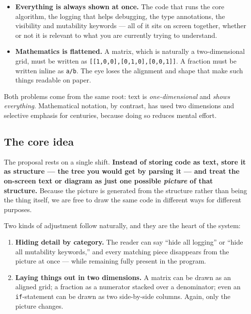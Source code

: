 \documentclass[11pt]{article}
\newcommand{\req}[1]{\textbf{\color{accent}#1}}
\begin{document}
\begin{itemize}[leftmargin=1.4em,itemsep=3pt]
  \item \textbf{Everything is always shown at once.} The code that runs the core algorithm, the logging that helps debugging, the type annotations, the visibility and mutability keywords --- all of it sits on screen together, whether or not it is relevant to what you are currently trying to understand.
  \item \textbf{Mathematics is flattened.} A matrix, which is naturally a two-dimensional grid, must be written as \texttt{[[1,0,0],[0,1,0],[0,0,1]]}. A fraction must be written inline as \texttt{a/b}. The eye loses the alignment and shape that make such things readable on paper.
\end{itemize}

Both problems come from the same root: text is \emph{one-dimensional} and \emph{shows everything}. Mathematical notation, by contrast, has used two dimensions and selective emphasis for centuries, because doing so reduces mental effort.

\subsection{The core idea}
The proposal rests on a single shift. \textbf{Instead of storing code as text, store it as structure --- the tree you would get by parsing it --- and treat the on-screen text or diagram as just one possible \emph{picture} of that structure.} Because the picture is generated from the structure rather than being the thing itself, we are free to draw the same code in different ways for different purposes.

Two kinds of adjustment follow naturally, and they are the heart of the system:

\begin{enumerate}[leftmargin=1.4em,itemsep=3pt]
  \item \req{Hiding detail by category.} The reader can say ``hide all logging'' or ``hide all mutability keywords,'' and every matching piece disappears from the picture at once --- while remaining fully present in the program.
  \item \req{Laying things out in two dimensions.} A matrix can be drawn as an aligned grid; a fraction as a numerator stacked over a denominator; even an \texttt{if}-statement can be drawn as two side-by-side columns. Again, only the picture changes.
\end{enumerate}
\end{document}
